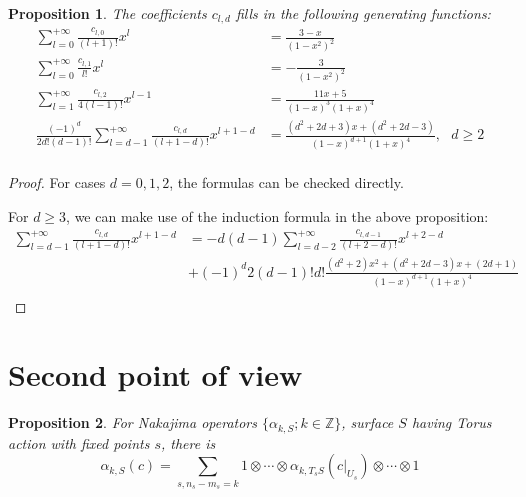 \documentclass{article}
\newtheorem{prop}{Proposition}[theorem]
\begin{document}
\begin{prop}
The coefficients $c_{l,d}$ fills in the following generating functions:
\[\begin{aligned}
\sum_{l=0}^{+\infty}\frac{c_{l,0}}{(l+1)!}x^l &= \frac{3-x}{(1-x^2)^2}\\
\sum_{l=0}^{+\infty}\frac{c_{l,1}}{l!}x^l &= -\frac{3}{(1-x^2)^2}\\
\sum_{l=1}^{+\infty}\frac{c_{l,2}}{4(l-1)!}x^{l-1} &= \frac{11x+5}{(1-x)^3(1+x)^4}\\
\frac{(-1)^d}{2d!(d-1)!}\sum_{l=d-1}^{+\infty}\frac{c_{l,d}}{(l+1-d)!}x^{l+1-d} &= \frac{(d^2+2d+3)x+(d^2+2d-3)}{(1-x)^{d+1}(1+x)^4},\text{     }d\geqslant2\\
\end{aligned}\]
\end{prop}
\begin{proof}

For cases $d = 0,1,2$, the formulas can be checked directly.

For $d\geqslant 3$, we can make use of the induction formula in the above proposition:
\[\begin{aligned}
\sum_{l=d-1}^{+\infty}\frac{c_{l,d}}{(l+1-d)!} x^{l+1-d} &= -d(d-1)\sum_{l=d-2}^{+\infty}\frac{c_{l,d-1}}{(l+2-d)!}x^{l+2-d}\\ &+ (-1)^d2(d-1)!d!\frac{ (d^2+2)x^2 + (d^2+2d-3)x + (2d+1) }{(1-x)^{d+1}(1+ x)^4}\\
\iffalse
\sum_{l=2}^{+\infty}\frac{c_{l,3}}{(l-2)!}x^{l-2} &= -144\frac{3x+2}{(1-x)^4(1+x)^4}\\
\sum_{l=3}^{+\infty}\frac{c_{l,4}}{(l-3)!}x^{l-3}&=864\frac{9x+7}{(1-x)^5(1+x)^4}\\
\sum_{l=4}^{+\infty}\frac{c_{l,5}}{(l-4)!}x^{l-4}&=-11520\frac{19x+16}{(1-x)^6(1+x)^4}\\
\sum_{l=5}^{+\infty}\frac{c_{l,6}}{(l-5)!}x^{l-5}&=518400\frac{17x+15}{(1-x)^7(1+x)^4}\\
\sum_{l=6}^{+\infty}\frac{c_{l,7}}{(l-6)!}x^{l-6}&=-43545600\frac{11x+10}{(1-x)^7(1+x)^4}\\\fi
\end{aligned}\]
\end{proof}
\section{Second point of view}
\begin{prop}
For Nakajima operators $\{\alpha_{k,S};k\in\mathbb{Z}\}$, surface $S$ having Torus action with fixed points $s$, there is 
\[\alpha_{k,S}(c)=\sum_{s,n_s-m_s=k}1\otimes\cdots\otimes \alpha_{k,T_sS}(c|_{U_s})\otimes\cdots\otimes1\]
\end{prop}
\end{document}
